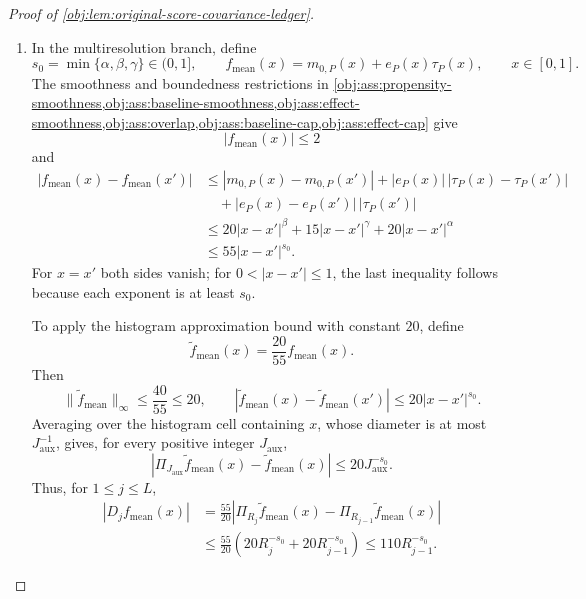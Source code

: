 \documentclass[11pt]{article}
\begin{document}
\begin{proof}[Proof of \cref{obj:lem:original-score-covariance-ledger}]
\begin{enumerate}
The augmented kernel has singleton projection
\[
k_{r,u}^{(1)}(o)
=
\frac{h_{r,u}(o)-\mathbb E[h_{r,u}(O)]}{2}
+
g_{r,u}^{(1)}(o).
\]
Centering decreases second moment, so the triangle inequality in \(L_2(P)\) gives
\[
2\|k_{r,u}^{(1)}\|_{L_2(P)}
\le
\sqrt{\mathbb E[h_{r,u}(O)^2]}
+
2\sqrt{
\mathbb E\!\left[
\left\{\mathbb E[g_{r,u}(O,O')\mid O]\right\}^{2}
\right]}.
\]
Here
\[
\operatorname{Var}_P(k_{r,u}^{(1)})
=
\|k_{r,u}^{(1)}\|_{L_2(P)}^2
\]
because its mean is zero.

In the single-correction branch, the projection estimate with
\(J_{\mathrm{aux}}=K\) and \(T=T_0\) gives
\[
\mathbb E\!\left[
\left\{\mathbb E[g_{r,u}(O,O')\mid O]\right\}^{2}
\right]
\le B_{g,\mathrm{single}}^2\|u\|_2^2,
\qquad
B_{g,\mathrm{single}}=\sqrt{V_0}.
\]
It follows that
\[
4\operatorname{Var}_P(k_{r,u}^{(1)})
\le
(B_h+2B_{g,\mathrm{single}})^2\|u\|_2^2
=
(4\sqrt{V_0})^2\|u\|_2^2
\le
(16\sqrt{V_0})^2\|u\|_2^2
=
L_1^2\|u\|_2^2.
\]

\item In the multiresolution branch, define
\[
s_0=\min\{\alpha,\beta,\gamma\}\in(0,1],
\qquad
f_{\mathrm{mean}}(x)=m_{0,P}(x)+e_P(x)\tau_P(x),
\qquad x\in[0,1].
\]
The smoothness and boundedness restrictions in
\cref{obj:ass:propensity-smoothness,obj:ass:baseline-smoothness,obj:ass:effect-smoothness,obj:ass:overlap,obj:ass:baseline-cap,obj:ass:effect-cap}
give
\[
|f_{\mathrm{mean}}(x)|\le2
\]
and
\[
\begin{aligned}
|f_{\mathrm{mean}}(x)-f_{\mathrm{mean}}(x')|
&\le
|m_{0,P}(x)-m_{0,P}(x')|
+
|e_P(x)|\,|\tau_P(x)-\tau_P(x')|\\
&\quad+
|e_P(x)-e_P(x')|\,|\tau_P(x')|\\
&\le
20|x-x'|^\beta
+
15|x-x'|^\gamma
+
20|x-x'|^\alpha\\
&\le55|x-x'|^{s_0}.
\end{aligned}
\]
For \(x=x'\) both sides vanish; for \(0<|x-x'|\le1\), the last inequality follows because each exponent is at least \(s_0\).

To apply the histogram approximation bound with constant \(20\), define
\[
\widetilde f_{\mathrm{mean}}(x)=\frac{20}{55}f_{\mathrm{mean}}(x).
\]
Then
\[
\|\widetilde f_{\mathrm{mean}}\|_\infty\le\frac{40}{55}\le20,
\qquad
|\widetilde f_{\mathrm{mean}}(x)-\widetilde f_{\mathrm{mean}}(x')|
\le20|x-x'|^{s_0}.
\]
Averaging over the histogram cell containing \(x\), whose diameter is at most \(J_{\mathrm{aux}}^{-1}\), gives, for every positive integer \(J_{\mathrm{aux}}\),
\[
|\Pi_{J_{\mathrm{aux}}}\widetilde f_{\mathrm{mean}}(x)
-\widetilde f_{\mathrm{mean}}(x)|
\le20J_{\mathrm{aux}}^{-s_0}.
\]
Thus, for \(1\le j\le L\),
\[
\begin{aligned}
|D_jf_{\mathrm{mean}}(x)|
&=
\frac{55}{20}
\left|
\Pi_{R_j}\widetilde f_{\mathrm{mean}}(x)
-
\Pi_{R_{j-1}}\widetilde f_{\mathrm{mean}}(x)
\right|\\
&\le
\frac{55}{20}
\left(20R_j^{-s_0}+20R_{j-1}^{-s_0}\right)
\le110R_{j-1}^{-s_0}.
\end{aligned}
\]


\end{enumerate}
\end{proof}
\end{document}
